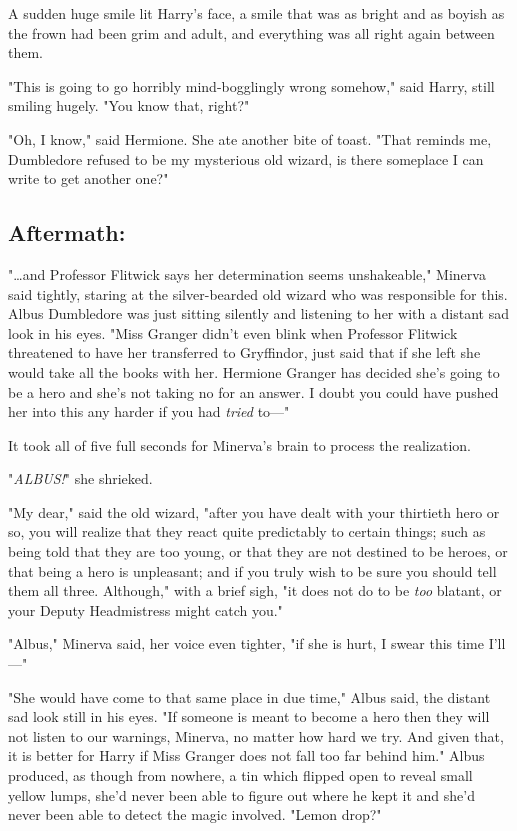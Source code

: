 A sudden huge smile lit Harry's face, a smile that was as bright and as boyish 
as the frown had been grim and adult, and everything was all right again 
between them.

"This is going to go horribly mind-bogglingly wrong somehow," said Harry, still 
smiling hugely. "You know that, right?"

"Oh, I know," said Hermione. She ate another bite of toast. "That reminds me, 
Dumbledore refused to be my mysterious old wizard, is there someplace I can 
write to get another one?"
\sbreak
\subsection{Aftermath:}

"{\ldots}and Professor Flitwick says her determination seems unshakeable," 
Minerva said tightly, staring at the silver-bearded old wizard who was 
responsible for this. Albus Dumbledore was just sitting silently and listening 
to her with a distant sad look in his eyes. "Miss Granger didn't even blink 
when Professor Flitwick threatened to have her transferred to Gryffindor, just 
said that if she left she would take all the books with her. Hermione Granger 
has decided she's going to be a hero and she's not taking no for an answer. I 
doubt you could have pushed her into this any harder if you had \emph{tried} 
to---"

It took all of five full seconds for Minerva's brain to process the realization.

"\emph{ALBUS!}" she shrieked.

"My dear," said the old wizard, "after you have dealt with your thirtieth hero 
or so, you will realize that they react quite predictably to certain things; 
such as being told that they are too young, or that they are not destined to be 
heroes, or that being a hero is unpleasant; and if you truly wish to be sure 
you should tell them all three. Although," with a brief sigh, "it does not do 
to be \emph{too} blatant, or your Deputy Headmistress might catch you."

"Albus," Minerva said, her voice even tighter, "if she is hurt, I swear this 
time I'll---"

"She would have come to that same place in due time," Albus said, the distant 
sad look still in his eyes. "If someone is meant to become a hero then they 
will not listen to our warnings, Minerva, no matter how hard we try. And given 
that, it is better for Harry if Miss Granger does not fall too far behind him." 
Albus produced, as though from nowhere, a tin which flipped open to reveal 
small yellow lumps, she'd never been able to figure out where he kept it and 
she'd never been able to detect the magic involved. "Lemon drop?"

